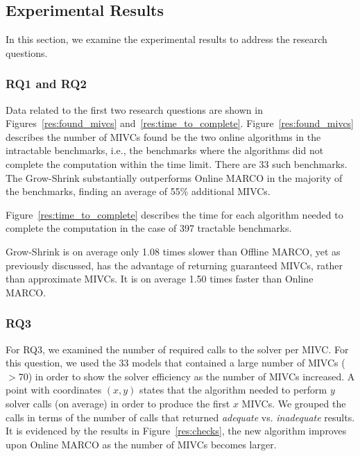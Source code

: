 


\subsection{Experimental Results}
In this section, we examine the experimental results to address the research questions.


\subsubsection{RQ1 and RQ2}
Data related to the first two research questions are shown in Figures~\ref{res:found_mivcs} and~\ref{res:time_to_complete}.
Figure~\ref{res:found_mivcs} describes the number of MIVCs found be the two online algorithms in the intractable benchmarks, i.e., the benchmarks where the algorithms did not complete the computation within the time limit. There are 33 such benchmarks. The Grow-Shrink substantially outperforms Online MARCO in the majority of the benchmarks, finding an average of 55\% additional MIVCs.

Figure~\ref{res:time_to_complete} describes the time for each algorithm needed to complete the computation in the case of 397 tractable benchmarks.

Grow-Shrink is on
average only 1.08 times slower than Offline MARCO,
yet as previously discussed,
has the advantage of returning guaranteed MIVCs,
rather than approximate MIVCs.
It is on average 1.50 times faster than Online MARCO.





\subsubsection{RQ3}  For RQ3, we examined the number of required calls to the solver per MIVC.  For this question, we used the 33 models that contained a large number of MIVCs ($>$70) in order to show the solver efficiency as the number of MIVCs increased.  A point with coordinates $(x,y)$ states that the algorithm needed to perform $y$ solver calls (on average) in order to produce the first $x$ MIVCs. We grouped the calls in terms of the number of calls that returned {\em adequate} vs. {\em inadequate} results.  It is evidenced by the results in Figure~\ref{res:checks}, the new algorithm improves upon Online MARCO as the number of MIVCs becomes larger.

